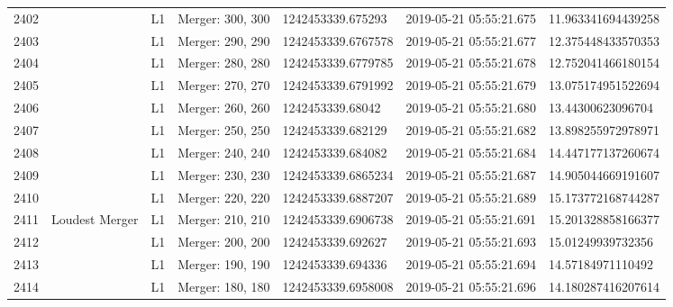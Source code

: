 \begin{longtable}{lllllll}
2402 &                                                    &       L1 &  Merger: 300, 300 &   1242453339.675293 &  2019-05-21 05:55:21.675 &  11.963341694439258 \\
2403 &                                                    &       L1 &  Merger: 290, 290 &  1242453339.6767578 &  2019-05-21 05:55:21.677 &  12.375448433570353 \\
2404 &                                                    &       L1 &  Merger: 280, 280 &  1242453339.6779785 &  2019-05-21 05:55:21.678 &  12.752041466180154 \\
2405 &                                                    &       L1 &  Merger: 270, 270 &  1242453339.6791992 &  2019-05-21 05:55:21.679 &  13.075174951522694 \\
2406 &                                                    &       L1 &  Merger: 260, 260 &    1242453339.68042 &  2019-05-21 05:55:21.680 &   13.44300623096704 \\
2407 &                                                    &       L1 &  Merger: 250, 250 &   1242453339.682129 &  2019-05-21 05:55:21.682 &  13.898255972978971 \\
2408 &                                                    &       L1 &  Merger: 240, 240 &   1242453339.684082 &  2019-05-21 05:55:21.684 &  14.447177137260674 \\
2409 &                                                    &       L1 &  Merger: 230, 230 &  1242453339.6865234 &  2019-05-21 05:55:21.687 &  14.905044669191607 \\
2410 &                                                    &       L1 &  Merger: 220, 220 &  1242453339.6887207 &  2019-05-21 05:55:21.689 &  15.173772168744287 \\
2411 &                                     Loudest Merger &       L1 &  Merger: 210, 210 &  1242453339.6906738 &  2019-05-21 05:55:21.691 &  15.201328858166377 \\
2412 &                                                    &       L1 &  Merger: 200, 200 &   1242453339.692627 &  2019-05-21 05:55:21.693 &   15.01249939732356 \\
2413 &                                                    &       L1 &  Merger: 190, 190 &   1242453339.694336 &  2019-05-21 05:55:21.694 &   14.57184971110492 \\
2414 &                                                    &       L1 &  Merger: 180, 180 &  1242453339.6958008 &  2019-05-21 05:55:21.696 &  14.180287416207614 \\

\end{longtable}
